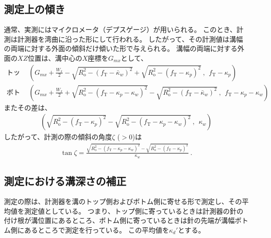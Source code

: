 \subsection{測定上の傾き}
通常、実測にはマイクロメータ（デプスゲージ）が用いられる。
このとき、計測は計測器を湾曲に沿った形にして行われる。
したがって、その計測値は溝幅の両端に対する外面の傾斜だけ傾いた形で与えられる。
溝幅の両端に対する外面の$XZ$位置は、溝中心の$X$座標を$G_{mx}$として、
\begin{align*}
  \text{トップ側：}&~~
  \left(
  G_{mx}+\frac{W_x}2
  -\sqrt{R_\mathrm o^2-(f_\mathrm T-\bar\kappa_w)^2}
  +\sqrt{R_\mathrm o^2-(f_\mathrm T-\kappa_p)^2}~,~~
  f_\mathrm T-\kappa_p
  \right)\\
  \text{ボトム側：}&~~
  \left(
  G_{mx}+\frac{W_x}2
  +\sqrt{R_\mathrm o^2-(f_\mathrm T-\kappa_p-\kappa_w)^2}
  -\sqrt{R_\mathrm o^2-(f_\mathrm T-\bar\kappa_w)^2}~,~~
  f_\mathrm T-\kappa_p-\kappa_w
  \right)
\end{align*}
またその差は、
\begin{align*}
  \left(
  \sqrt{R_\mathrm o^2-(f_\mathrm T-\kappa_p)^2}
  -\sqrt{R_\mathrm o^2-(f_\mathrm T-\kappa_p-\kappa_w)^2}~,~~
  \kappa_w
  \right)
\end{align*}
したがって、計測の際の傾斜の角度$\zeta$ ($> 0$)は
\begin{align}
  \label{eq:angleZeta}
  \tan\zeta
  = \frac{\sqrt{R_\mathrm o^2-\left(f_\mathrm T-\kappa_p-\kappa_w\right)^2}
          -\sqrt{R_\mathrm o^2-\left(f_\mathrm T-\kappa_p\right)^2}}
         {\kappa_w}\ .
\end{align}


\clearpage
\subsection{測定における溝深さの補正\label{subsec:keywayDepthDif}}
測定の際は、計測器を溝のトップ側およびボトム側に寄せる形で測定し、その平均値を測定値としている。
つまり、トップ側に寄っているときは計測器の針の付け根が溝位置にあるところ、ボトム側に寄っているときは針の先端が溝幅ボトム側にあるところで測定を行っている。
この平均値を$\kappa_d'$とする。

